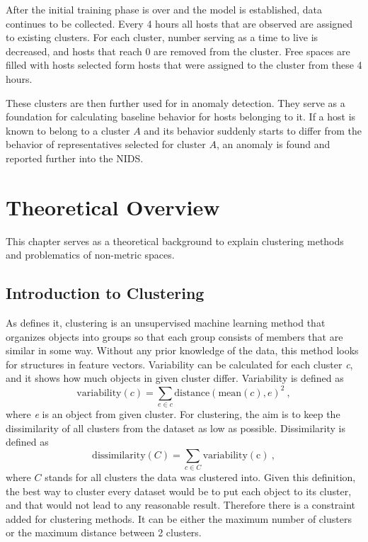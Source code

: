 \documentclass[thesis=B,english]{FITthesis}[2012/10/20]
\def\cbl{\color{blue}} %
\begin{document}
After the initial training phase is over and the model is established, data continues to be collected.
Every 4 hours all hosts that are observed are assigned to existing clusters.
For each cluster, number serving as a time to live is decreased, and hosts that reach 0 are removed from the cluster.
Free spaces are filled with hosts selected form hosts that were assigned to the cluster from these 4 hours.

These clusters are then further used for in anomaly detection.
They serve as a foundation for calculating baseline behavior for hosts belonging to it.
If a host is known to belong to a cluster $A$ and its behavior suddenly starts to differ from the behavior of representatives selected for cluster $A$, an anomaly is found and reported further into the NIDS.


\chapter{Theoretical Overview}

This chapter serves as a theoretical background to explain clustering methods and problematics of non-metric spaces.

\section{Introduction to Clustering}
As \cite{guttag2016introduction} defines it, clustering is an unsupervised machine learning method that organizes objects into groups so that each group consists of members that are similar in some way.
Without any prior knowledge of the data, this method looks for structures in feature vectors.
Variability can be calculated for each cluster \textit{c}, and it shows how much objects in given cluster differ.
Variability is defined as
{\cbl
$$
\mathrm{variability}(c) = \sum_{e \in c} \mathrm{distance}(\mathrm{mean}(c), e)^2 \:,
$$
}%
where \textit{e} is an object from given cluster.
For clustering, the aim is to keep the dissimilarity of all clusters from the dataset as low as possible.
Dissimilarity is defined as
{\cbl
$$ \mathrm{dissimilarity}(C) = \sum_{c \in C} \mathrm{variability(c)} \:,$$
}%
where {\cbl $C$} stands for all clusters the data was clustered into.
Given this definition, the best way to cluster every dataset would be to put each object to its cluster, and that would not lead to any reasonable result.
Therefore there is a constraint added for clustering methods.
It can be either the maximum number of clusters or the maximum distance between 2 clusters. \\
\end{document}
